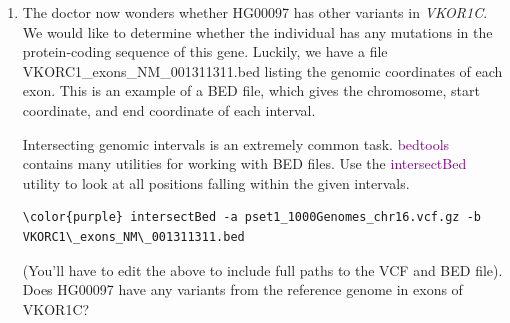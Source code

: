 \documentclass[12pt]{article}
\begin{document}
\begin{enumerate}
Now, use the tabix utility to pull out our SNP of interest:
\begin{Verbatim}[commandchars=\\\{\}]
\color{purple} tabix --print-header pset1\_1000Genomes\_chr16.vcf.gz 16:31104509-31104510
\end{Verbatim}

What dose should the doctor give to HG00097? What about HG00099 and HG00103?

\item The doctor now wonders whether HG00097 has other variants in \emph{VKOR1C}. We would like to determine whether the individual has any mutations in the protein-coding sequence of this gene. Luckily, we have a file VKORC1\_exons\_NM\_001311311.bed listing the genomic coordinates of each exon. This is an example of a BED file, which gives the chromosome, start coordinate, and end coordinate of each interval.

Intersecting genomic intervals is an extremely common task. \textcolor{purple}{bedtools} contains many utilities for working with BED files. Use the \textcolor{purple}{intersectBed} utility to look at all positions falling within the given intervals.
\begin{Verbatim}[commandchars=\\\{\}]
\color{purple} intersectBed -a pset1_1000Genomes_chr16.vcf.gz -b VKORC1\_exons_NM\_001311311.bed
\end{Verbatim}
(You'll have to edit the above to include full paths to the VCF and BED file). Does HG00097 have any variants from the reference genome in exons of VKOR1C?

\end{enumerate}
\end{document}
